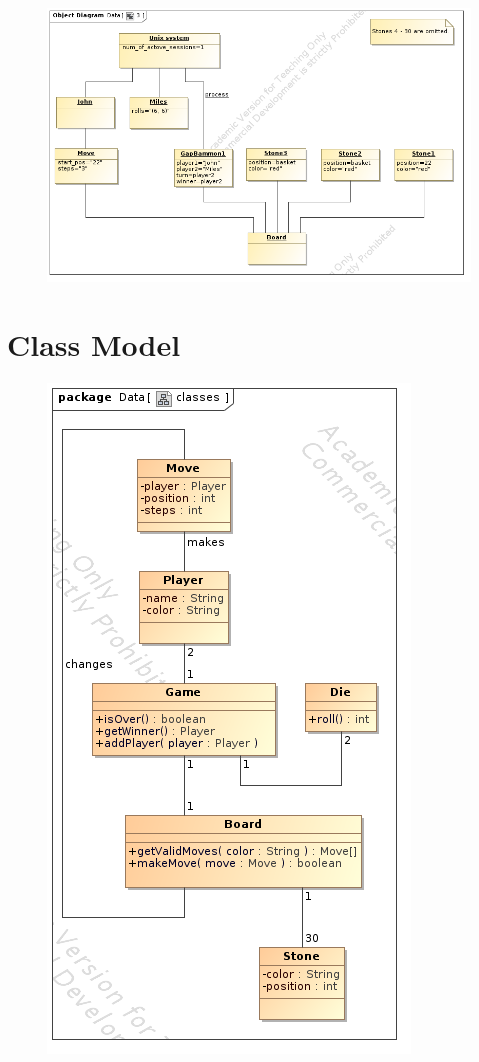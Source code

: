 \documentclass[11pt]{article}
\begin{document}
\begin{enumerate}[I]
\begin{figure}[!h]
\includegraphics[scale=0.5]{3.png}
\end{figure}
\end{enumerate}
\newpage

\section{Class Model}
\begin{figure}[!h]
\includegraphics[scale=0.7]{classes.png}
\end{figure}
\newpage
\end{document}
